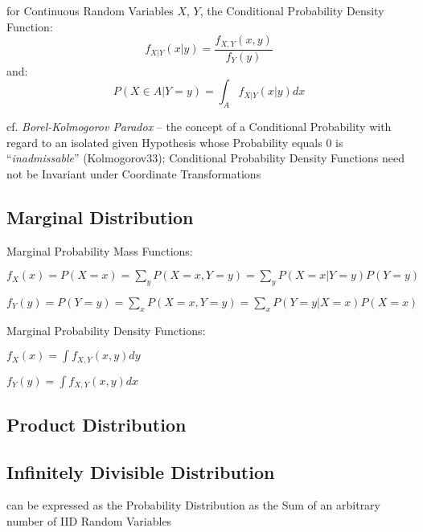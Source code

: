 for Continuous Random Variables $X$, $Y$, the Conditional Probability Density
Function:
\[
  f_{X|Y}(x|y) = \frac{f_{X,Y}(x,y)}{f_Y(y)}
\]
and:
\[
  P(X \in A| Y = y) = \int_A f_{X|Y}(x|y) dx
\]

cf. \emph{Borel-Kolmogorov Paradox} -- the concept of a Conditional Probability
with regard to an isolated given Hypothesis whose Probability equals $0$ is
``\emph{inadmissable}'' (Kolmogorov33); Conditional Probability Density
Functions need not be Invariant under Coordinate Transformations



\subsection{Marginal Distribution}\label{sec:marginal_distribution}

Marginal Probability Mass Functions:

$f_X(x) = P(X = x) = \sum_y P(X = x, Y = y) = \sum_y P(X = x | Y = y) P(Y = y)$

$f_Y(y) = P(Y = y) = \sum_x P(X = x, Y = y) = \sum_x P(Y = y | X = x) P(X = x)$

Marginal Probability Density Functions:

$f_X(x) = \int f_{X,Y}(x,y) dy$

$f_Y(y) = \int f_{X,Y}(x,y) dx$



\subsection{Product Distribution}\label{sec:product_distribution}

\subsection{Infinitely Divisible Distribution}
\label{sec:infinitely_divisible}

can be expressed as the Probability Distribution as the Sum of an arbitrary
number of IID Random Variables

